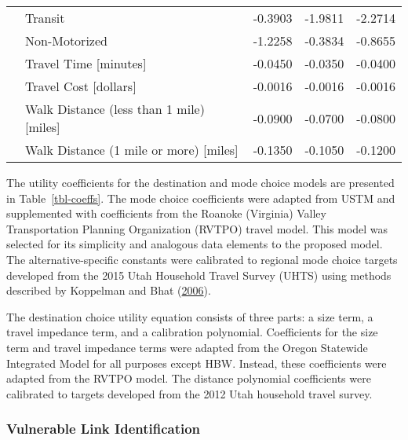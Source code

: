 \documentclass[]{ascelike-new}
\begin{document}
\begin{table}
\begin{tabular}[t]{llrrr}
\hspace{1em} & Transit & -0.3903 & -1.9811 & -2.2714\\

\hspace{1em} & Non-Motorized & -1.2258 & -0.3834 & -0.8655\\

\hspace{1em} & Travel Time [minutes] & -0.0450 & -0.0350 & -0.0400\\

\hspace{1em} & Travel Cost [dollars] & -0.0016 & -0.0016 & -0.0016\\

\hspace{1em} & Walk Distance (less than 1 mile) [miles] & -0.0900 & -0.0700 & -0.0800\\

\hspace{1em} & Walk Distance (1 mile or more) [miles] & -0.1350 & -0.1050 & -0.1200\\
\bottomrule
\end{tabular}
\end{table}

The utility coefficients for the destination and mode choice models are
presented in Table~\ref{tbl-coeffs}. The mode choice coefficients were
adapted from USTM and supplemented with coefficients from the Roanoke
(Virginia) Valley Transportation Planning Organization (RVTPO) travel
model. This model was selected for its simplicity and analogous data
elements to the proposed model. The alternative-specific constants were
calibrated to regional mode choice targets developed from the 2015 Utah
Household Travel Survey (UHTS) using methods described by Koppelman and
Bhat (\protect\hyperlink{ref-koppelman2006}{2006}).

The destination choice utility equation consists of three parts: a size
term, a travel impedance term, and a calibration polynomial.
Coefficients for the size term and travel impedance terms were adapted
from the Oregon Statewide Integrated Model for all purposes except HBW.
Instead, these coefficients were adapted from the RVTPO model. The
distance polynomial coefficients were calibrated to targets developed
from the 2012 Utah household travel survey.

\hypertarget{vulnerable-link-identification}{%
\subsubsection{Vulnerable Link
Identification}\label{vulnerable-link-identification}}
\end{document}
